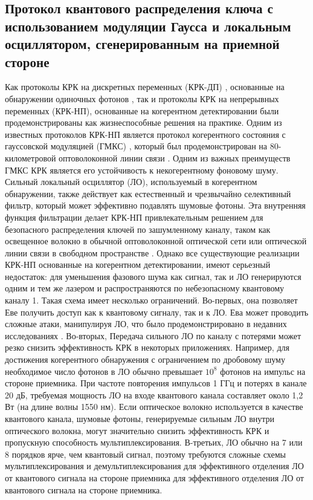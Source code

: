 \subsection{Протокол квантового распределения ключа с использованием модуляции Гаусса и локальным осциллятором, сгенерированным на приемной стороне}\label{sec:ch1/sect4/subsec2} %
Как протоколы КРК на дискретных переменных  (КРК-ДП) , основанные на обнаружении одиночных фотонов \cite{bennett1984,ekert1991}, так и протоколы КРК на непрерывных переменных (КРК-НП), основанные на когерентном детектировании \cite{ralph1999,hillery2000,grosshans2002} были продемонстрированы как жизнеспособные решения на практике. Одним из известных протоколов КРК-НП является протокол когерентного состояния с гауссовской модуляцией (ГМКС) \cite{grosshans2002}, который был продемонстрирован на 80-километровой оптоволоконной  линии связи \cite{jouguet2013a}. Одним из важных преимуществ ГМКС КРК  является его устойчивость к некогерентному фоновому шуму. Сильный локальный осциллятор (ЛО), используемый в когерентном обнаружении, также действует как естественный и чрезвычайно селективный фильтр, который может эффективно подавлять шумовые фотоны. Эта внутренняя функция фильтрации делает КРК-НП привлекательным решением для безопасного распределения ключей по зашумленному каналу, таком как освещенное волокно в обычной оптоволоконной оптической сети \cite{kumar2015} или оптической линии связи в свободном пространстве \cite{heim2014}.
Однако все существующие реализации КРК-НП основанные на когерентном детектировании, имеют серьезный недостаток: для уменьшения фазового шума как сигнал, так и ЛО генерируются одним и тем же лазером и распространяются по небезопасному квантовому каналу \cite{grosshans2002, jouguet2013a, heim2014} 1. Такая схема имеет несколько ограничений. Во-первых, она позволяет Еве получить доступ как к квантовому сигналу, так и к ЛО. Ева может проводить сложные атаки, манипулируя ЛО, что было продемонстрировано в недавних исследованиях \cite{ma2013, huang2013,jouguet2013}. Во-вторых, Передача сильного ЛО по каналу с потерями может резко снизить эффективность КРК в некоторых приложениях. Например, для достижения когерентного обнаружения с ограничением по дробовому шуму необходимое число фотонов в ЛО обычно превышает $10^8$ фотонов на импульс на стороне приемника. При частоте повторения импульсов 1 ГГц и потерях в канале 20 дБ, требуемая мощность ЛО на входе квантового канала составляет около 1,2 Вт (на длине волны 1550 нм). Если оптическое волокно используется в качестве квантового канала, шумовые фотоны, генерируемые сильным ЛО внутри оптического волокна, могут значительно снизить эффективность КРК и пропускную способность мультиплексирования. В-третьих, ЛО обычно на 7 или 8 порядков ярче, чем квантовый сигнал, поэтому требуются сложные схемы мультиплексирования и демультиплексирования для эффективного отделения ЛО от квантового сигнала на стороне приемника для эффективного отделения ЛО от квантового сигнала на стороне приемника.

